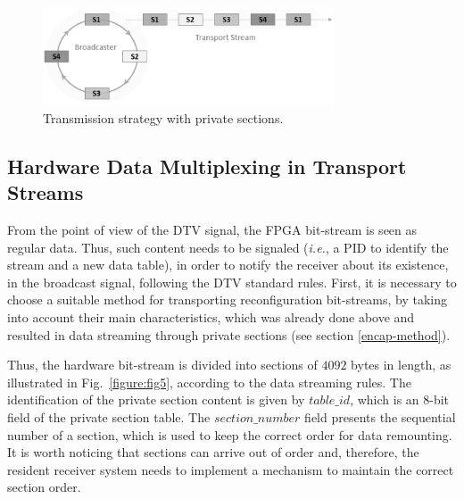 \begin{figure}[ht]
\centering
\includegraphics[width=3.4in]{images/cyc.eps}
\caption{Transmission strategy with private sections.}
\label{figure:figcyc}
\end{figure}


\subsection{Hardware Data Multiplexing in Transport Streams}\label{data-multiplexing}
From the point of view of the DTV signal, the FPGA bit-stream is seen as regular data. Thus, such content needs to be signaled ({\em i.e.}, a PID to identify the stream and a new data table), in order to notify the receiver about its existence, in the broadcast signal, following the DTV standard rules. First, it is necessary to choose a suitable method for transporting reconfiguration bit-streams, by taking into account their main characteristics, which was already done above and resulted in data streaming through private sections (see section \ref{encap-method}).





Thus, the hardware bit-stream is divided into sections of $4092$ bytes in length, as illustrated in Fig.~\ref{figure:fig5}, according to the data streaming rules. The identification of the private section content is given by $table\_id$, which is an $8$-bit field of the private section table. The $section\_number$ field presents the sequential number of a section, which is used to keep the correct order for data remounting. It is worth noticing that sections can arrive out of order and, therefore, the resident receiver system needs to implement a mechanism to maintain the correct section order.

